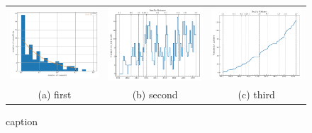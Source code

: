 \begin{figure}
\begin{tabular}{ccc}
  \includegraphics[width=55mm]{figures/busfactor_plot.pdf} &   \includegraphics[width=55mm]{figures/committers_per_month_vs_time.pdf} &
  \includegraphics[width=55mm]{figures/cumulative_authors.pdf} \\
(a) first & (b) second & (c) third
\end{tabular}
\caption{caption}
\label{fig:image2}
\end{figure}


